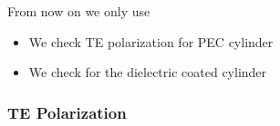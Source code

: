 
  
  \begin{frame}[plain]
    From now on we only use {\GreenD}
    \begin{itemize}
    \item We check TE polarization for PEC cylinder
    \item We check for the dielectric coated  cylinder 
    \end{itemize}
  \end{frame}
  
  \subsubsection{TE Polarization}
  
